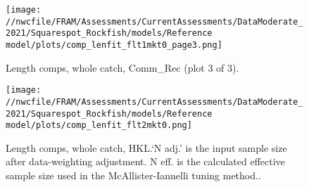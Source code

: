 \documentclass[11pt,
  english,
  a4paper,
]{article}
\begin{document}

\begin{figure}
\centering
\texttt{[image: //nwcfile/FRAM/Assessments/CurrentAssessments/DataModerate\_2021/Squarespot\_Rockfish/models/Reference model/plots/comp\_lenfit\_flt1mkt0\_page3.png]}
\caption{Length comps, whole catch, Comm\_Rec (plot 3 of 3).\label{fig:comp_lenfit_flt1mkt0_page3}}
\end{figure}

\tagmcend\tagstructend


\begin{figure}
\centering
\texttt{[image: //nwcfile/FRAM/Assessments/CurrentAssessments/DataModerate\_2021/Squarespot\_Rockfish/models/Reference model/plots/comp\_lenfit\_flt2mkt0.png]}
\caption{Length comps, whole catch, HKL.`N adj.' is the input sample size after data-weighting adjustment. N eff. is the calculated effective sample size used in the McAllister-Iannelli tuning method..\label{fig:comp_lenfit_flt2mkt0}}
\end{figure}

\tagmcend\tagstructend
\end{document}
